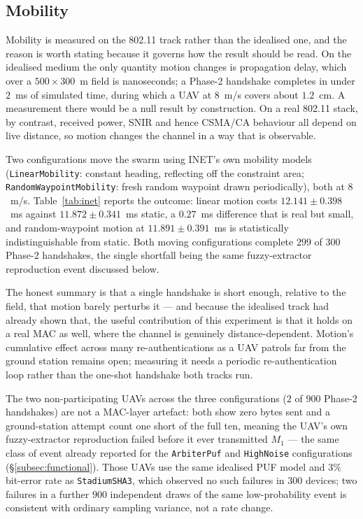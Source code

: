 \documentclass[11pt,a4paper]{article}
\begin{document}
\subsection{Mobility}
\label{subsec:mobility}

Mobility is measured on the 802.11 track rather than the idealised one, and the
reason is worth stating because it governs how the result should be read. On the
idealised medium the only quantity motion changes is propagation delay, which
over a $500\times300$~m field is nanoseconds; a Phase-2 handshake completes in
under $2$~ms of simulated time, during which a UAV at $8$~m/s covers about
$1.2$~cm. A measurement there would be a null result by construction. On a real
802.11 stack, by contrast, received power, SNIR and hence CSMA/CA behaviour all
depend on live distance, so motion changes the channel in a way that is
observable.

Two configurations move the swarm using INET's own mobility models
(\texttt{LinearMobility}: constant heading, reflecting off the constraint area;
\texttt{RandomWaypointMobility}: fresh random waypoint drawn periodically), both
at $8$~m/s. Table~\ref{tab:inet} reports the outcome: linear motion costs
$12.141 \pm 0.398$~ms against $11.872 \pm 0.341$~ms static, a $0.27$~ms
difference that is real but small, and random-waypoint motion at
$11.891 \pm 0.391$~ms is statistically indistinguishable from static. Both
moving configurations complete $299$ of $300$ Phase-2 handshakes, the single
shortfall being the same fuzzy-extractor reproduction event discussed below.

The honest summary is that a single handshake is short enough, relative to the
field, that motion barely perturbs it --- and because the idealised track had
already shown that, the useful contribution of this experiment is that it holds
on a real MAC as well, where the channel is genuinely distance-dependent.
Motion's cumulative effect across many re-authentications as a UAV patrols far
from the ground station remains open; measuring it needs a periodic
re-authentication loop rather than the one-shot handshake both tracks run.

The two non-participating UAVs across the three configurations ($2$ of $900$
Phase-2 handshakes) are not a MAC-layer artefact: both show zero bytes sent and a
ground-station attempt count one short of the full ten, meaning the UAV's own
fuzzy-extractor reproduction failed before it ever transmitted $M_1$ --- the same
class of event already reported for the \texttt{ArbiterPuf} and \texttt{HighNoise}
configurations (\S\ref{subsec:functional}). Those UAVs use the same idealised PUF
model and $3\%$ bit-error rate as \texttt{StadiumSHA3}, which observed no such
failures in $300$ devices; two failures in a further $900$ independent draws of
the same low-probability event is consistent with ordinary sampling variance, not
a rate change.
\end{document}
